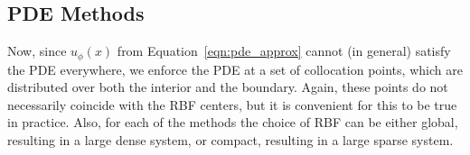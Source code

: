 \documentclass[11pt]{report}
\begin{document}
{%



 
\subsection{PDE Methods} 

Now, since $u_{\phi}(x)$ from Equation~\ref{eqn:pde_approx} cannot (in general) satisfy the PDE everywhere, we enforce the PDE at a set of collocation points, which are  distributed over both the interior and the boundary. Again, these points do not necessarily coincide with the RBF centers, but it is convenient for this to be true in practice. Also, for each of the methods the choice of RBF can be either global, resulting in a large dense system, or compact, resulting in a large sparse system. 

}
\end{document}
